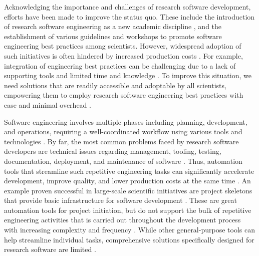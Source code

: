 \documentclass{article}
\begin{document}
Acknowledging the importance and challenges of research software development, efforts have been made to improve the status quo. These include the introduction of research software engineering as a new academic discipline \cite{RSEIntro, RSEReportUK, RSEHistory, WhyScienceNeedsMoreRSE, SoftwareSustainabilityInstitute}, and the establishment of various guidelines \cite{FAIR4RS, 4SimpleRecs, 10MetricsForSciSoftware, BestPracticesForSciComp, RecommendOnResearchSoftware, ELIXIRSoftwareManagementPlan, NLeScienceSoftDevGuide, BestPracticesInBioinfSoftware, 10RuleForSoftwareInCompBio, SustainableResearchSoftwareHandOver, QuickGuideToOrgCompBioProjects, EnhancingReproducibility, SciSoftDevIsNotOxymoron, 5RecommendedPracticesForCompSci, 10SimpleRulesOnWritingCleanAndReliableSciSoft, BarelySufficientPracticesInSciComp, GoodEnoughPracticesInSciComp} and workshops \cite{SoftwareCarpentryOriginal, SoftwareCarpentry, SoftEngForSci} to promote software engineering best practices among scientists. However, widespread adoption of such initiatives is often hindered by increased production costs \cite{RSEPillars, RSEinUnis, HowToSupportOpenSource, SoftDevEnvForSciSoft, NamingThePainInDevSciSoft}. For example, integration of engineering best practices can be challenging due to a lack of supporting tools and limited time and knowledge \cite{ConfigManageForLargescaleSciComp}. To improve this situation, we need solutions that are readily accessible and adoptable by all scientists, empowering them to employ research software engineering best practices with ease and minimal overhead \cite{ManagingChaos, SoftEngForCompSci}.

Software engineering involves multiple phases including planning, development, and operations, requiring a well-coordinated workflow using various tools and technologies \cite{CollabSoftEngBookConcepts, StateOfArtInEndUserSoftEng}. By far, the most common problems faced by research software developers are technical issues regarding management, tooling, testing, documentation, deployment, and maintenance of software \cite{NamingThePainInDevSciSoft, ShiningLight, PublishYourCode, BetterSoftwareBetterResearch, SurveySEPracticesInScience, ReprodResearchInCompSci, CaseForOpenCompProg}. Thus, automation tools that streamline such repetitive engineering tasks can significantly accelerate development, improve quality, and lower production costs at the same time \cite{SoftEngForCompSci, BestPracticesForSciComp, AdoptingSoftEngConceptsInSciResearch}. An example proven successful in large-scale scientific initiatives \cite{TrilinosProject} are project skeletons that provide basic infrastructure for software development \cite{ProjectSkeletonsReview}. These are great automation tools for project initiation, but do not support the bulk of repetitive engineering activities that is carried out throughout the development process with increasing complexity and frequency \cite{CollabSoftEngBookConcepts, StateOfArtInEndUserSoftEng, ConfigManageForLargescaleSciComp}. While other general-purpose tools can help streamline individual tasks, comprehensive solutions specifically designed for research software are limited \cite{Bertha, MolSSITemplate, SSCTemplate}.
\end{document}
